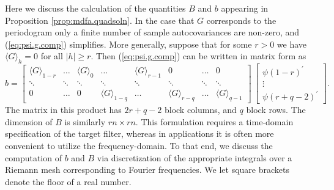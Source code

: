 \documentclass[a4paper]{book}
\begin{document}
 Here we discuss the calculation of the quantities $B$ and $b$ appearing in 
 Proposition \ref{prop:mdfa.quadsoln}.  In the case that $G$ corresponds to
 the periodogram  only a finite number of sample
 autocovariances are non-zero,  and (\ref{eq:psi.g.comp}) simplifies.
More generally, suppose that for some $r > 0$
 we have ${ \langle G \rangle }_h = 0$ for all $|h| \geq r$.  Then 
(\ref{eq:psi.g.comp}) can be written in matrix form as
\[
 b  =  \left[ \begin{array}{cccccccc} { \langle G \rangle }_{1-r} & \ldots &
    { \langle G \rangle }_0 & \ldots & { \langle G \rangle }_{r-1} &  0 & \ldots & 0 \\
    		\ddots & \ddots & \ddots & \ddots & \ddots & \ddots & \ddots & \ddots \\
    		0  &  \ldots & 0 & {\langle G \rangle}_{1-q} & \ldots & { \langle G \rangle }_{r-q} &
    		\ldots &  { \langle G \rangle }_{q-1}  \end{array} \right] \,
    \left[ \begin{array}{c} {\psi (1-r) }^{\prime} \\   \vdots \\ {\psi (r+q-2) }^{\prime}
     \end{array} \right].
\]
 The matrix in this product has $2r+q-2$ block columns, and $q$ block rows.
 The dimension of $B$ is similarly $rn \times rn$.  This formulation requires
 a time-domain specification of the target filter, whereas in applications it is
 often more convenient to utilize the frequency-domain.  To that end, we discuss the 
 computation of $b$ and $B$ via discretization of the appropriate integrals over
 a Riemann mesh corresponding to Fourier frequencies.  We let square brackets
 denote the floor of a real number.
\end{document}
